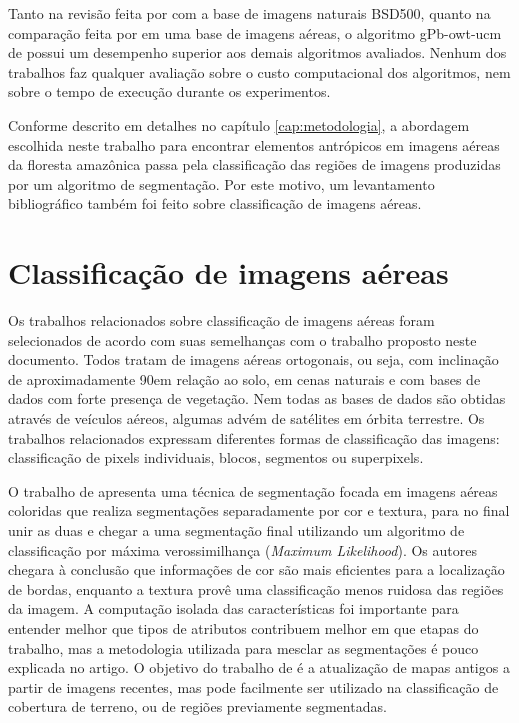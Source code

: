 Tanto na revisão feita por  com a base de imagens naturais BSD500, quanto na comparação feita por  em uma base de imagens aéreas, o algoritmo gPb-owt-ucm de  possui um desempenho superior aos demais algoritmos avaliados. Nenhum dos trabalhos faz qualquer avaliação sobre o custo computacional dos algoritmos, nem sobre o tempo de execução durante os experimentos.

Conforme descrito em detalhes no capítulo \ref{cap:metodologia}, a abordagem escolhida neste trabalho para encontrar elementos antrópicos em imagens aéreas da floresta amazônica passa pela classificação das regiões de imagens produzidas por um algoritmo de segmentação. Por este motivo, um levantamento bibliográfico também foi feito sobre classificação de imagens aéreas.

\section{Classificação de imagens aéreas}\label{sec:trClassificacao}

Os trabalhos relacionados sobre classificação de imagens aéreas foram selecionados de acordo com suas semelhanças com o trabalho proposto neste documento. Todos tratam de imagens aéreas ortogonais, ou seja, com inclinação de aproximadamente 90\degree em relação ao solo, em cenas naturais e com bases de dados com forte presença de vegetação. Nem todas as bases de dados são obtidas através de veículos aéreos, algumas advém de satélites em órbita terrestre. Os trabalhos relacionados expressam diferentes formas de classificação das imagens: classificação de pixels individuais, blocos, segmentos ou superpixels.


O trabalho de  apresenta uma técnica de segmentação focada em imagens aéreas coloridas que realiza segmentações separadamente por cor e textura, para no final unir as duas e chegar a uma segmentação final utilizando um algoritmo de classificação por máxima verossimilhança (\textit{Maximum Likelihood}). Os autores chegara à conclusão que informações de cor são mais eficientes para a localização de bordas, enquanto a textura provê uma classificação menos ruidosa das regiões da imagem. A computação isolada das características foi importante para entender melhor que tipos de atributos contribuem melhor em que etapas do trabalho, mas a metodologia utilizada para mesclar as segmentações é pouco explicada no artigo. O objetivo do trabalho de  é a atualização de mapas antigos a partir de imagens recentes, mas pode facilmente ser utilizado na classificação de cobertura de terreno, ou de regiões previamente segmentadas.


